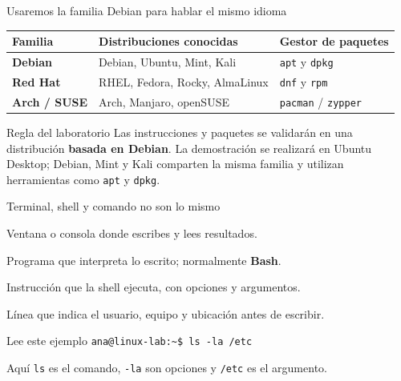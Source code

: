 \documentclass[aspectratio=169,10pt,c]{beamer}
\begin{document}
\begin{frame}{Usaremos la familia Debian para hablar el mismo idioma}
\begin{center}
\small
\begin{tabular}{>{\bfseries}p{3.2cm}p{4.2cm}p{3.7cm}}
\toprule
Familia & Distribuciones conocidas & Gestor de paquetes \\
\midrule
Debian & Debian, Ubuntu, Mint, Kali & \texttt{apt} y \texttt{dpkg} \\
Red Hat & RHEL, Fedora, Rocky, AlmaLinux & \texttt{dnf} y \texttt{rpm} \\
Arch / SUSE & Arch, Manjaro, openSUSE & \texttt{pacman} / \texttt{zypper} \\
\bottomrule
\end{tabular}
\end{center}
\vspace{0.2cm}
\begin{alertblock}{Regla del laboratorio}
\small Las instrucciones y paquetes se validarán en una distribución \textbf{basada en Debian}. La demostración se realizará en Ubuntu Desktop; Debian, Mint y Kali comparten la misma familia y utilizan herramientas como \texttt{apt} y \texttt{dpkg}.
\end{alertblock}
\end{frame}

\begin{frame}{Terminal, shell y comando no son lo mismo}
\begin{description}[Comando]\small
  \item[Terminal] Ventana o consola donde escribes y lees resultados.
  \item[Shell] Programa que interpreta lo escrito; normalmente \textbf{Bash}.
  \item[Comando] Instrucción que la shell ejecuta, con opciones y argumentos.
  \item[Prompt] Línea que indica el usuario, equipo y ubicación antes de escribir.
\end{description}
\vspace{0.2cm}
\begin{exampleblock}{Lee este ejemplo}
\centering\texttt{ana@linux-lab:\textasciitilde\$ ls -la /etc}
\end{exampleblock}
\small Aquí \texttt{ls} es el comando, \texttt{-la} son opciones y \texttt{/etc} es el argumento.
\end{frame}
\end{document}
